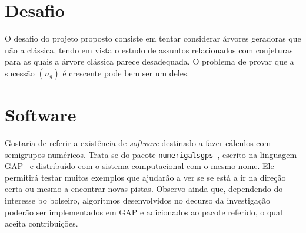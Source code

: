 \documentclass[12pt,a4paper]{article}
\numberwithin{table}{section}
\numberwithin{figure}{section}
\numberwithin{equation}{section}
\theoremstyle{definition}
\theoremstyle{remark}
\begin{document}
\section{Desafio}\label{sec:desafio}


O desafio do projeto proposto consiste em tentar considerar árvores geradoras que não a clássica, tendo em vista o estudo de assuntos relacionados com conjeturas para as quais a árvore clássica parece desadequada. O problema de provar que a sucessão \(\left(n_g\right)\) é crescente pode bem ser um deles.

\section{Software}\label{sec:software}
Gostaria de referir a existência de \emph{software} destinado a fazer cálculos com semigrupos numéricos. Trata-se do pacote \texttt{numerigalsgps}~\cite{NumericalSgps1.4.0}, escrito na linguagem GAP~\cite{GAP4.15.1} e distribuído com o sistema computacional com o mesmo nome. Ele permitirá testar muitos exemplos que ajudarão a ver se se está a ir na direção certa ou mesmo a encontrar novas pistas.
Observo ainda que, dependendo do interesse bo bolseiro, algoritmos desenvolvidos no decurso da investigação poderão ser implementados em GAP e adicionados ao pacote referido, o qual aceita contribuições.


\printbibliography
% 
%
\end{document}
